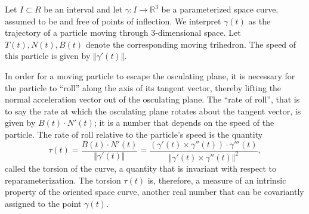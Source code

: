 \documentclass{article}
\newcommand{\reals}{\mathbb{R}}
\begin{document}
Let $I\subset R$ be an interval and let $\gamma:I\to\reals^3$ be a
parameterized space curve, assumed to be
 and free of points of inflection. We
interpret $\gamma(t)$ as the trajectory of a particle moving through
3-dimensional space. Let $T(t), N(t), B(t)$ denote the corresponding
moving trihedron. The speed of this particle is given by $\Vert
\gamma'(t) \Vert$.

In order for a moving particle to escape the osculating plane, it is
necessary for the particle to ``roll'' along the axis of its tangent
vector, thereby lifting the normal acceleration vector out of the
osculating plane. The ``rate of roll'', that is to say the rate at
which the osculating plane rotates about the tangent vector, is given
by $B(t)\cdot N'(t)$; it is a number that depends on the
speed of the particle. The rate of roll relative to the particle's
speed is the quantity
$$\tau(t) = \frac{B(t)\cdot N'(t)}{\Vert \gamma'(t)\Vert}= \frac{(
\gamma'(t)\times \gamma''(t)) \cdot \gamma'''(t)}{\Vert \gamma'(t)\times
\gamma''(t)\Vert^2 },$$
called the torsion of the curve, a quantity
that is invariant with respect to reparameterization. The torsion
$\tau(t)$ is, therefore, a measure of an intrinsic property of the
oriented space curve, another real number that can be covariantly
assigned to the point $\gamma(t)$.
\end{document}
